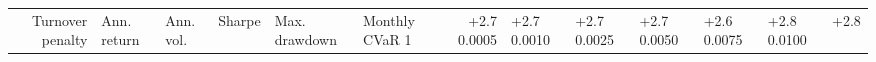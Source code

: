 \begin{tabular}{rllrllrl}
\toprule
Turnover penalty & Ann. return & Ann. vol. & Sharpe & Max. drawdown & Monthly CVaR 1%
 & +2.7%
0.0005 & +2.7%
0.0010 & +2.7%
0.0025 & +2.7%
0.0050 & +2.6%
0.0075 & +2.8%
0.0100 & +2.8%
\bottomrule
\end{tabular}
